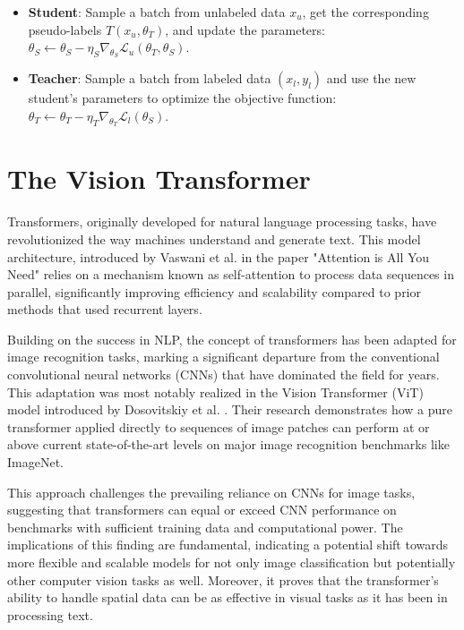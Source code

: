 \begin{itemize}
    \item \textbf{Student}: Sample a batch from unlabeled data $x_u$, get the 
    corresponding pseudo-labels $T(x_u, \theta_T)$, and update the parameters: 
    $\theta_S \leftarrow \theta_S - \eta_S \nabla_{\theta_S} \mathcal{L}_u(\theta_T, \theta_S)$.
    \item \textbf{Teacher}: Sample a batch from labeled data $(x_l, y_l)$ and 
    use the new student's parameters to optimize the objective function:
    $\theta_T \leftarrow \theta_T - \eta_T \nabla_{\theta_T} \mathcal{L}_l(\theta_S)$.
\end{itemize}


\section{The Vision Transformer}

Transformers, originally developed for natural language processing tasks, have 
revolutionized the way machines understand and generate text. 
This model architecture, introduced by Vaswani et al. in the paper 
"Attention is All You Need" \cite{attention_is_all_you_need} relies on a 
mechanism known as self-attention to 
process data sequences in parallel, significantly improving efficiency and 
scalability compared to prior methods that used recurrent layers.

Building on the success in NLP, the concept of transformers has been adapted 
for image recognition tasks, marking a significant departure from the 
conventional convolutional neural networks (CNNs) that have dominated the field 
for years. This adaptation was most notably realized in the Vision Transformer 
(ViT) model introduced by Dosovitskiy et al. \cite{vit}. Their research demonstrates how a 
pure transformer applied directly to sequences of image patches can perform at 
or above current state-of-the-art levels on major image recognition benchmarks 
like ImageNet.

This approach challenges the prevailing reliance on CNNs for image tasks, 
suggesting that transformers can equal or exceed CNN performance on benchmarks 
with sufficient training data and computational power. The implications of this 
finding are fundamental, indicating a potential shift towards more flexible and 
scalable models for not only image classification but potentially other computer 
vision tasks as well.
Moreover, it proves that the transformer's ability to handle 
spatial data can be as effective in visual tasks as it has been in 
processing text.

